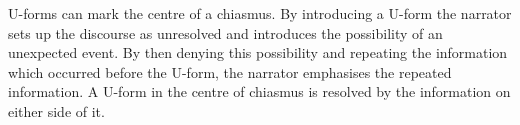 U-forms can mark the centre of a chiasmus.
By introducing a U-form the narrator
sets up the discourse as unresolved and introduces
the possibility of an unexpected event.
By then denying this possibility and
repeating the information which occurred before the U-form,
the narrator emphasises the repeated information.
A U-form in the centre of chiasmus is resolved by
the information on either side of it.
